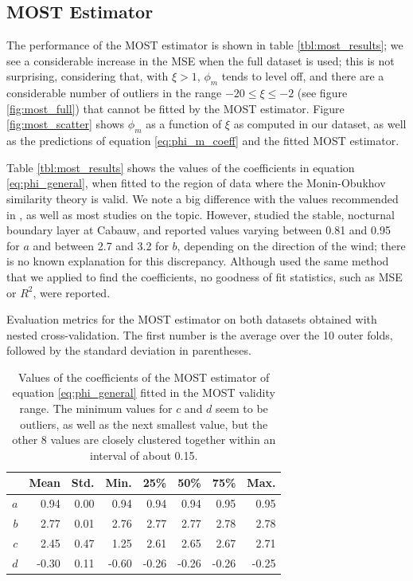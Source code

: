 \documentclass[a4paper]{book}
\begin{document}
\subsection{MOST Estimator}
The performance of the MOST estimator is shown in table \ref{tbl:most_results}; we see a considerable increase in the MSE when the full dataset is used; this is not surprising, considering that, with $\xi>1$, $\phi_m$ tends to level off, and there are a considerable number of outliers in the range $-20\leq\xi\leq-2$ (see figure \ref{fig:most_full}) that cannot be fitted by the MOST estimator. Figure \ref{fig:most_scatter} shows $\phi_m$ as a function of $\xi$ as computed in our dataset, as well as the predictions of equation \ref{eq:phi_m_coeff} and the fitted MOST estimator.
 
Table \ref{tbl:most_results} shows the values of the coefficients in equation \ref{eq:phi_general}, when fitted to the region of data where the Monin-Obukhov similarity theory is valid. We note a big difference with the values recommended in \cite{hogstrom88}, as well as most studies on the topic. However, \cite{cabauw_night_most} studied the stable, nocturnal boundary layer at Cabauw, and reported values varying between 0.81 and 0.95 for $a$ and between 2.7 and 3.2 for $b$, depending on the direction of the wind; there is no known explanation for this discrepancy. Although \cite{cabauw_night_most} used the same method that we applied to find the coefficients, no goodness of fit statistics, such as MSE or $R^2$, were reported.

\begin{table}[]
\centering
\caption{Evaluation metrics for the MOST estimator on both datasets obtained with nested cross-validation. The first number is the average over the 10 outer folds, followed by the standard deviation in parentheses.}
\label{tbl:most_results}

\end{table}

\begin{table}[]
\centering
\caption{Values of the coefficients of the MOST estimator of equation \ref{eq:phi_general} fitted in the MOST validity range. The minimum values for $c$ and $d$ seem to be outliers, as well as the next smallest value, but the other 8 values are closely clustered together within an interval of about 0.15.}
\label{tbl:most_coeffs}
\begin{tabular}{r|rrrrrrr}
\toprule
   & \textbf{Mean} & \textbf{Std.} & \textbf{Min.} & \textbf{25\%} & \textbf{50\%} & \textbf{75\%} & \textbf{Max.} \\ \midrule
$a$ & 0.94 & 0.00 & 0.94 & 0.94 & 0.94 & 0.95 & 0.95 \\
$b$ & 2.77 & 0.01 & 2.76 & 2.77 & 2.77 & 2.78 & 2.78 \\
$c$ & 2.45 & 0.47 & 1.25 & 2.61 & 2.65 & 2.67 & 2.71 \\
$d$ & -0.30 & 0.11 & -0.60 & -0.26 & -0.26 & -0.26 & -0.25 \\
\bottomrule
\end{tabular}
\end{table}
\end{document}
